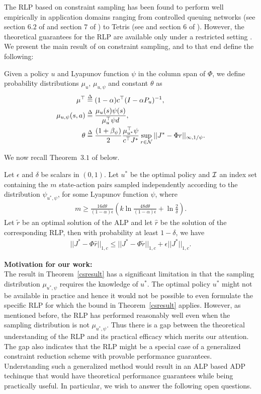 The RLP based on constraint sampling has been found to perform well empirically in application domains ranging from controlled queuing networks (see section $6.2$ of \cite{ALP} and section $7$ of \cite{SALP}) to Tetris (see \cite{CST} and section $6$ of \cite{SALP}). However, the theoretical guarantees for the RLP are available only under a restricted setting \cite{CS}. We present the main result of \cite{CS} on constraint sampling, and to that end define the following:
\begin{definition}\label{sampdist}
Given a policy $u$ and Lyapunov function $\psi$ in the column span of $\Phi$, we define probability distributions $\mu_u$, $\mu_{u,\psi}$ and constant $\theta$ as 
\begin{align}
\mu^\top&\stackrel{\Delta}{=}(1-\alpha)c^\top (I-\alpha P_u)^{-1},\nonumber\\
\mu_{u,\psi}(s,a)&\stackrel{\Delta}{=}\frac{\mu_{u}(s) \psi(s)}{\mu_u^\top \psi d},\nonumber\\
\theta&\stackrel{\Delta}{=}\frac{(1+\beta_{\psi})}{2}\frac{\mu_{u^*}^\top \psi}{c^\top J^*}\sup_{r\in \mathcal{N}}||J^*-\Phi r||_{\infty,1/\psi}.
\end{align}
\end{definition}
We now recall Theorem~$3.1$ of \cite{CS} below.
\begin{theorem}\label{csresult}
Let $\epsilon$ and $\delta$ be scalars in $(0,1)$. Let $u^*$ be the optimal policy and $\mathcal{I}$ an index set containing the $m$ state-action pairs sampled independently according to the distribution $\psi_{u^*,\psi}$, for some Lyapunov function $\psi$, where
\begin{align}
m\geq \frac{16d\theta}{(1-\alpha)\epsilon}\left(k\ln\frac{48d\theta}{(1-\alpha)\epsilon}+\ln\frac{2}{\delta}\right).
\end{align}
Let $\tilde{r}$ be an optimal	solution of the ALP and let $\hat{r}$ be the solution of the corresponding RLP, then with probability at least $1-\delta$, we have
\begin{align}
||J^*-\Phi \hat{r}||_{1,c}\leq ||J^*-\Phi \tilde{r}||_{1,c}+\epsilon||J^*||_{1,c}.
\end{align}
\end{theorem}
\textbf{Motivation for our work:}\\
The result in Theorem~\ref{csresult} has a significant limitation in that the sampling distribution $\mu_{u^*,\psi}$ requires the knowledge of $u^*$. The optimal policy $u^*$ might not be available in practice and hence it would not be possible to even formulate the specific RLP for which the bound in Theorem~\ref{csresult} applies. However, as mentioned before, the RLP has performed reasonably well even when the sampling distribution is not $\mu_{u^*,\psi}$. Thus there is a gap between the theoretical understanding of the RLP and its practical efficacy which merits our attention. The gap also indicates that the RLP might be a special case of a generalized constraint reduction scheme with provable performance guarantees. Understanding such a generalized method would result in an ALP based ADP techinque that would have theoretical performance guarantees while being practically useful. In particular, we wish to answer the following open questions.
